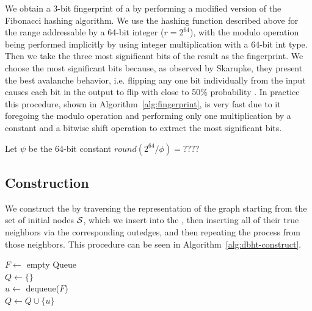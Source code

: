 We obtain a 3-bit fingerprint of a \kmer by performing a modified version of the Fibonacci hashing algorithm. We use the hashing function described above for the range addressable by a 64-bit integer ($r=2^{64}$), with the modulo operation being performed implicitly by using integer multiplication with a 64-bit int type. Then we take the three most significant bits of the result as the fingerprint. We choose the most significant bits because, as observed by Skarupke, they present the best avalanche behavior, i.e. flipping any one bit individually from the input causes each bit in the output to flip with close to 50\% probability \cite{Skarupke2018}. In practice this procedure, shown in Algorithm~\ref{alg:fingerprint}, is very fast due to it foregoing the modulo operation and performing only one multiplication by a constant and a bitwise shift operation to extract the most significant bits.

\begin{algorithm}
  \caption{$\mathit{fingerprint(X)}$}\label{alg:fingerprint}
  Let $\psi$ be the 64-bit constant $\mathit{round}({2^{64}}/{\phi})=????$\\
 
\end{algorithm}

\subsection{\dBHT Construction}
\label{subsubsec:dbht-construction}

We construct the \dBHT by traversing the \dBCM representation of the graph starting from the set of initial nodes $\strsetname{S}$, which we insert into the \dBHT, then inserting all of their true neighbors via the corresponding outedges, and then repeating the process from those neighbors. This procedure can be seen in Algorithm~\ref{alg:dbht-construct}.

\begin{algorithm}
	\caption{$T.\mathit{construct}(C)$}\label{alg:dbht-construct}
  $F \gets$ empty Queue\\
  $Q \gets \{\}$\\
   {
    $u \gets$ dequeue($F$)\\
    $Q \gets Q \cup \{u\}$\\
  }
\end{algorithm}


